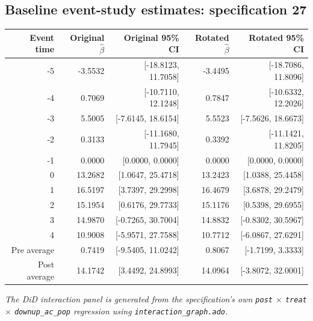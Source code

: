 \documentclass[10pt]{article}
\begin{document}
\subsection*{Baseline event-study estimates: specification 27}
\begin{center}
\scriptsize
\begin{tabular}{r rr rr}
\toprule
Event time & Original $\hat\beta$ & Original 95\% CI & Rotated $\hat\beta$ & Rotated 95\% CI \\
\midrule
-5 & -3.5532 & [-18.8123, 11.7058] & -3.4495 & [-18.7086, 11.8096] \\
-4 & 0.7069 & [-10.7110, 12.1248] & 0.7847 & [-10.6332, 12.2026] \\
-3 & 5.5005 & [-7.6145, 18.6154] & 5.5523 & [-7.5626, 18.6673] \\
-2 & 0.3133 & [-11.1680, 11.7945] & 0.3392 & [-11.1421, 11.8205] \\
-1 & 0.0000 & [0.0000, 0.0000] & 0.0000 & [0.0000, 0.0000] \\
0 & 13.2682 & [1.0647, 25.4718] & 13.2423 & [1.0388, 25.4458] \\
1 & 16.5197 & [3.7397, 29.2998] & 16.4679 & [3.6878, 29.2479] \\
2 & 15.1954 & [0.6176, 29.7733] & 15.1176 & [0.5398, 29.6955] \\
3 & 14.9870 & [-0.7265, 30.7004] & 14.8832 & [-0.8302, 30.5967] \\
4 & 10.9008 & [-5.9571, 27.7588] & 10.7712 & [-6.0867, 27.6291] \\
\midrule
Pre average & 0.7419 & [-9.5405, 11.0242] & 0.8067 & [-1.7199, 3.3333] \\
Post average & 14.1742 & [3.4492, 24.8993] & 14.0964 & [-3.8072, 32.0001] \\
\bottomrule
\end{tabular}
\end{center}
\medskip
\textit{The DiD interaction panel is generated from the specification's own \texttt{post} $\times$ \texttt{treat} $\times$ \texttt{downup\_ac\_pop} regression using \texttt{interaction\_graph.ado}.}
\clearpage
\end{document}
